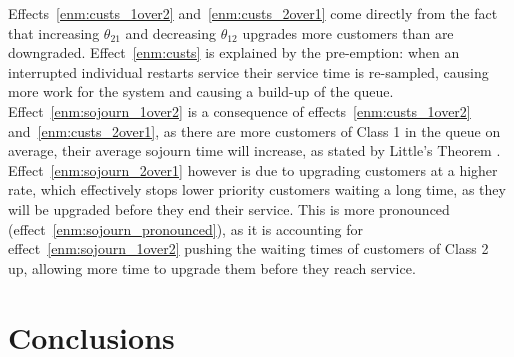 \documentclass{article}
\begin{document}
Effects~\ref{enm:custs_1over2} and~\ref{enm:custs_2over1} come directly from the
fact that increasing $\theta_{21}$ and decreasing $\theta_{12}$ upgrades more
customers than are downgraded. Effect~\ref{enm:custs} is explained by the
pre-emption: when an interrupted individual restarts service their service time
is re-sampled, causing more work for the system and causing a build-up of the
queue.
Effect~\ref{enm:sojourn_1over2} is a consequence of
effects~\ref{enm:custs_1over2} and~\ref{enm:custs_2over1}, as there are more
customers of Class 1 in the queue on average, their average sojourn time will
increase, as stated by Little's Theorem \cite{little61}.
Effect~\ref{enm:sojourn_2over1} however is due to upgrading customers at a
higher rate, which effectively stops lower priority customers waiting a long
time, as they will be upgraded before they end their service.
This is more pronounced (effect~\ref{enm:sojourn_pronounced}), as it is
accounting for effect~\ref{enm:sojourn_1over2} pushing the waiting times of
customers of Class 2 up, allowing more time to upgrade them before they reach
service.


\section{Conclusions}




\end{document}
